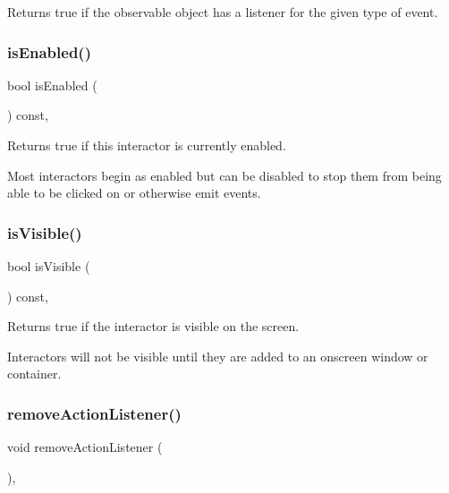 Returns true if the observable object has a listener for the given type of event. 

\mbox{\label{classGInteractor_aacb819fb241851fd9fc045271baa4034}} 
\subsubsection{\texorpdfstring{is\+Enabled()}{isEnabled()}}
{\footnotesize\ttfamily bool is\+Enabled (\begin{DoxyParamCaption}{ }\end{DoxyParamCaption}) const\hspace{0.3cm}{\ttfamily [virtual]}, {\ttfamily [inherited]}}



Returns true if this interactor is currently enabled. 

Most interactors begin as enabled but can be disabled to stop them from being able to be clicked on or otherwise emit events. \mbox{\label{classGInteractor_a9d8a6cfb13917785c143e74d40e4e2be}} 
\subsubsection{\texorpdfstring{is\+Visible()}{isVisible()}}
{\footnotesize\ttfamily bool is\+Visible (\begin{DoxyParamCaption}{ }\end{DoxyParamCaption}) const\hspace{0.3cm}{\ttfamily [virtual]}, {\ttfamily [inherited]}}



Returns true if the interactor is visible on the screen. 

Interactors will not be visible until they are added to an onscreen window or container. \mbox{\label{classGInteractor_ab7fe7a876367b87cf7202f947f1d05e4}} 
\subsubsection{\texorpdfstring{remove\+Action\+Listener()}{removeActionListener()}}
{\footnotesize\ttfamily void remove\+Action\+Listener (\begin{DoxyParamCaption}{ }\end{DoxyParamCaption})\hspace{0.3cm}{\ttfamily [virtual]}, {\ttfamily [inherited]}}



